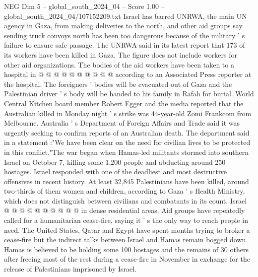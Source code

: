 \begin{textsample}{NEG Dim 5 – global\_south\_2024\_04 – Score 1.00 – global\_south\_2024\_04/107152209.txt}
Israel has barred UNRWA, the main UN agency in Gaza, from making deliveries to the north, and other aid groups say sending truck convoys north has been too dangerous because of the military ' s failure to ensure safe passage.
The UNRWA said in its latest report that 173 of its workers have been killed in Gaza.
The figure does not include workers for other aid organizations.
The bodies of the aid workers have been taken to a hospital in @ @ @ @ @ @ @ @ @ @ according to an Associated Press reporter at the hospital.
The foreigners ' bodies will be evacuated out of Gaza and the Palestinian driver ' s body will be handed to his family in Rafah for burial.
World Central Kitchen board member Robert Egger and the media reported that the Australian killed in Monday night ' s strike was 44-year-old Zomi Frankcom from Melbourne.
Australia ' s Department of Foreign Affairs and Trade said it was urgently seeking to confirm reports of an Australian death.
The department said in a statement :"We have been clear on the need for civilian lives to be protected in this conflict."The war began when Hamas-led militants stormed into southern Israel on October 7, killing some 1,200 people and abducting around 250 hostages.
Israel responded with one of the deadliest and most destructive offensives in recent history.
At least 32,845 Palestinians have been killed, around two-thirds of them women and children, according to Gaza ' s Health Ministry, which does not distinguish between civilians and combatants in its count.
Israel @ @ @ @ @ @ @ @ @ @ in dense residential areas.
Aid groups have repeatedly called for a humanitarian cease-fire, saying it ' s the only way to reach people in need.
The United States, Qatar and Egypt have spent months trying to broker a cease-fire but the indirect talks between Israel and Hamas remain bogged down.
Hamas is believed to be holding some 100 hostages and the remains of 30 others after freeing most of the rest during a cease-fire in November in exchange for the release of Palestinians imprisoned by Israel.

\end{textsample}
